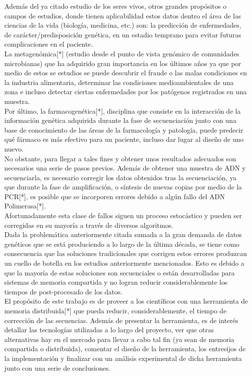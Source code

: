 \documentclass[conference]{IEEEtran}
\begin{document}
Además del ya citado estudio de los seres vivos, otros grandes propósitos o campos de estudios, donde tienen aplicabilidad estos datos dentro el área de las ciencias de la vida (biología, medicina, etc.) son: la predicción de enfermedades, de carácter/predisposición genética, en un estadio temprano para evitar futuras complicaciones en el paciente. \\
La metagenómica[*] (estudio desde el punto de vista genómico de comunidades microbianas) que ha adquirido gran importancia en los últimos años ya que por medio de estos se estudios se puede descubrir el fraude o las malas condiciones en la industria alimentaria, determinar las condiciones medioambientales de una zona e incluso detectar ciertas enfermedades por los patógenos registrados en una muestra.\\
Por último, la farmacogenética[*], disciplina que consiste en la interacción de la información genética adquirida durante la fase de secuenciación junto con una base de conocimiento de las áreas de la farmacología y patología, puede predecir qué fármaco es más efectivo para un paciente, incluso dar lugar al diseño de uno nuevo.
\\

No obstante, para llegar a tales fines y obtener unos resultados adecuados son necesarios una serie de pasos previos. Además de obtener una muestra de ADN y secuenciarla, es necesario corregir los datos obtenidos tras la secuenciación, ya que durante la fase de amplificación, o síntesis de nuevas copias por medio de la PCR[*], es posible que se incorporen errores debido a algún fallo del ADN Polimerasa[*].\\ Afortunadamente esta clase de fallos siguen un proceso estocástico y pueden ser corregidas en su mayoría a través de diversos algoritmos.
\\

Dada la problemática anteriormente citada sumada a la gran demanda de datos genéticos que se está produciendo a lo largo de la última década, se tiene como consecuencia que las soluciones tradicionales que corrigen estos errores produzcan un cuello de botella en los estudios anteriormente mencionados. Esto es debido a que la mayoría de estas soluciones son secuenciales o están desarrolladas para sistemas de memoria compartida y no logran reducir considerablemente los tiempos de post-procesado de los datos.
\\

El propósito de este trabajo es de proveer a los científicos con una herramienta de memoria distribuida[*] que pueda reducir, considerablemente, el tiempo de corrección de las secuencias. Además de presentar la herramienta, es de interés detallar las tecnologías utilizadas a lo largo del proyecto, ver que otras alternativas hay en el mercado para llevar a cabo tal fin (ya sean de memoria compartida o distribuida), comentar el diseño de la herramienta, los entresijos de la implementación y finalizar con un análisis experimental de dicha herramienta junto con una serie de conclusiones.\\
\end{document}
